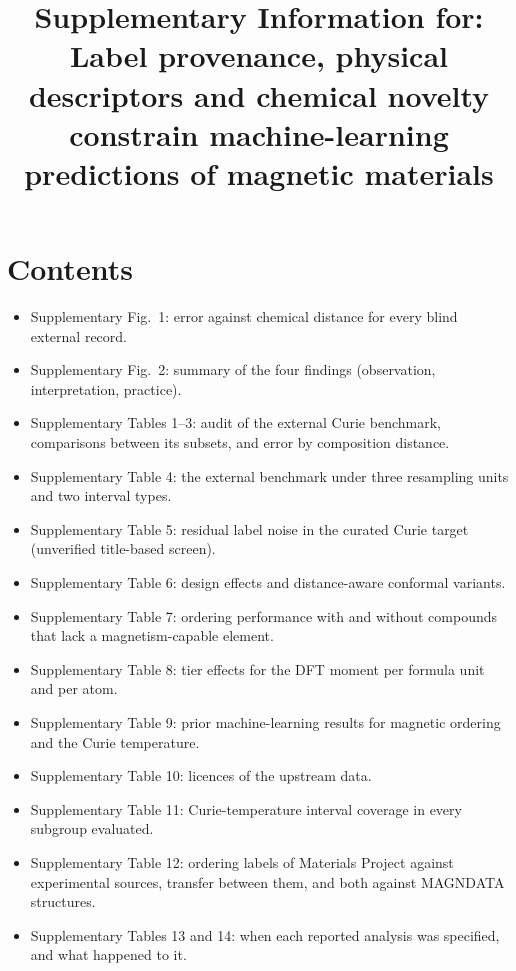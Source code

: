 \documentclass[pdflatex,sn-nature]{sn-jnl}
\begin{document}
\title[Supplementary Information]{Supplementary Information for: Label provenance, physical descriptors and chemical novelty constrain machine-learning predictions of magnetic materials}

\maketitle

\section{Contents}

\begin{itemize}
\item Supplementary Fig.~1: error against chemical distance for every blind external record.
\item Supplementary Fig.~2: summary of the four findings (observation, interpretation, practice).
\item Supplementary Tables 1--3: audit of the external Curie benchmark, comparisons between its subsets, and error by composition distance.
\item Supplementary Table 4: the external benchmark under three resampling units and two interval types.
\item Supplementary Table 5: residual label noise in the curated Curie target (unverified title-based screen).
\item Supplementary Table 6: design effects and distance-aware conformal variants.
\item Supplementary Table 7: ordering performance with and without compounds that lack a magnetism-capable element.
\item Supplementary Table 8: tier effects for the DFT moment per formula unit and per atom.
\item Supplementary Table 9: prior machine-learning results for magnetic ordering and the Curie temperature.
\item Supplementary Table 10: licences of the upstream data.
\item Supplementary Table 11: Curie-temperature interval coverage in every subgroup evaluated.
\item Supplementary Table 12: ordering labels of Materials Project against experimental sources, transfer between them, and both against MAGNDATA structures.
\item Supplementary Tables 13 and 14: when each reported analysis was specified, and what happened to it.

\end{itemize}
\end{document}
